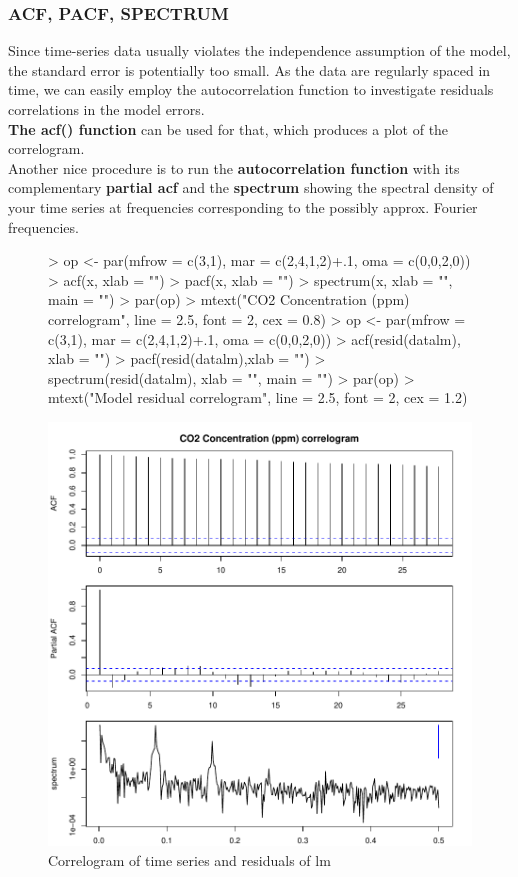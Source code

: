 \documentclass[11pt, a4paper]{article} %
\begin{document}
\subsubsection{ACF, PACF, SPECTRUM}
\noindent Since time-series data usually violates the independence assumption of the model, the standard error is potentially too small. As the data are regularly spaced in time, we can easily employ the autocorrelation function to investigate residuals correlations in the model errors.\\
\textbf{The acf() function} can be used for that, which produces a plot of the correlogram.\\
Another nice procedure is to run the \textbf{autocorrelation function} with its complementary \textbf{partial acf} and the \textbf{spectrum} showing the spectral density of your time series at frequencies corresponding to the possibly approx. Fourier frequencies. \\
\begin{figure}[H]
\centering
\begin{Schunk}
\begin{Sinput}
> op <- par(mfrow = c(3,1),
 mar = c(2,4,1,2)+.1,
 oma = c(0,0,2,0))
> acf(x, xlab = "")
> pacf(x, xlab = "")
> spectrum(x, xlab = "", main = "")
> par(op)
> mtext("CO2 Concentration (ppm) correlogram",
 line = 2.5,
 font = 2,
 cex = 0.8)
> op <- par(mfrow = c(3,1),
 mar = c(2,4,1,2)+.1,
 oma = c(0,0,2,0))
> acf(resid(datalm), xlab = "")
> pacf(resid(datalm),xlab = "")
> spectrum(resid(datalm), xlab = "", main = "")
> par(op)
> mtext("Model residual correlogram",
 line = 2.5,
 font = 2,
 cex = 1.2)
\end{Sinput}
\end{Schunk}
\includegraphics{alles-correlogram}
\caption{Correlogram of time series and residuals of lm}
\label{correlogram}
\end{figure}
\end{document}

